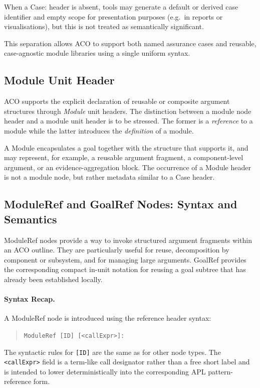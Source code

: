 \documentclass[11pt,twoside,a4paper]{article}
\begin{document}
When a Case: header is absent, tools may generate a default or derived case identifier and empty scope
for presentation purposes (e.g.\ in reports or visualisations), but this is not
treated as semantically significant.

This separation allows ACO to support both named assurance cases and reusable,
case-agnostic module libraries using a single uniform syntax.

\subsection{Module Unit Header}

ACO supports the explicit declaration of reusable or composite argument structures through
\emph{Module} unit headers.
The distinction between a module node header and a module unit header is to be stressed. The former is a \emph{reference} to a module while the latter introduces the \emph{definition} of a module.

A Module encapsulates a goal together with the structure that supports it,
and may represent, for example, a reusable argument fragment, a component-level argument,
or an evidence-aggregation block.
The occurrence of a Module header is not a module node, but rather metadata similar to a Case header.
%

\subsection{ModuleRef and GoalRef Nodes: Syntax and Semantics}
\label{sec:module-semantics}

ModuleRef nodes provide a way to invoke structured argument fragments within an
ACO outline. They are particularly useful for reuse, decomposition by component or subsystem,
and for managing large arguments. GoalRef provides the corresponding compact in-unit notation for reusing a goal subtree that has already been established locally.

\paragraph{Syntax Recap.}
A ModuleRef node is introduced using the reference header syntax:
\begin{quote}
\texttt{ModuleRef [ID] [<callExpr>]:}
\end{quote}
The syntactic rules for \texttt{[ID]} are the same as for other node types. The \texttt{<callExpr>} field is a term-like call designator rather than a free short label and is intended to lower deterministically into the corresponding APL pattern-reference form.
\end{document}
